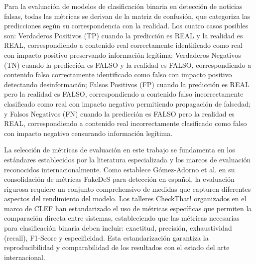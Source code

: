 Para la evaluación de modelos de clasificación binaria en detección de noticias falsas, todas las métricas se derivan de la matriz de confusión, que categoriza las predicciones según su correspondencia con la realidad. Los cuatro casos posibles son: Verdaderos Positivos (TP) cuando la predicción es REAL y la realidad es REAL, correspondiendo a contenido real correctamente identificado como real con impacto positivo preservando información legítima; Verdaderos Negativos (TN) cuando la predicción es FALSO y la realidad es FALSO, correspondiendo a contenido falso correctamente identificado como falso con impacto positivo detectando desinformación; Falsos Positivos (FP) cuando la predicción es REAL pero la realidad es FALSO, correspondiendo a contenido falso incorrectamente clasificado como real con impacto negativo permitiendo propagación de falsedad; y Falsos Negativos (FN) cuando la predicción es FALSO pero la realidad es REAL, correspondiendo a contenido real incorrectamente clasificado como falso con impacto negativo censurando información legítima.

La selección de métricas de evaluación en este trabajo se fundamenta en los estándares establecidos por la literatura especializada y los marcos de evaluación reconocidos internacionalmente. Como establece Gómez-Adorno et al. \cite{gomez2021overview} en su consolidación de métricas FakeDeS para detección en español, la evaluación rigurosa requiere un conjunto comprehensivo de medidas que capturen diferentes aspectos del rendimiento del modelo. Los talleres CheckThat! organizados en el marco de CLEF \cite{alam2023overview, barron2023clef} han estandarizado el uso de métricas específicas que permiten la comparación directa entre sistemas, estableciendo que las métricas necesarias para clasificación binaria deben incluir: exactitud, precisión, exhaustividad (recall), F1-Score y especificidad. Esta estandarización garantiza la reproducibilidad y comparabilidad de los resultados con el estado del arte internacional.

